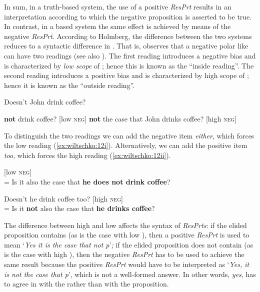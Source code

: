 \documentclass[output=paper]{LSP/langsci}
\begin{document}
In sum, in a truth-based system, the use of a positive \textit{ResPrt} results in an interpretation according to which the negative proposition is asserted to be true.
In contrast, in a  based system the same effect is achieved by means of the negative \textit{ResPrt}. According to Holmberg, the difference between the two systems reduces to a syntactic difference in . That is, \citet{Ladd1981} observes that a negative polar  like  can have two readings (see also \citealt{BüringGunlogson2000,RomeroHan2004,AsherReese2007}). The first reading  introduces a negative bias and is characterized by \textit{low scope} of ; hence this is known as the “inside  reading”. The second reading  introduces a positive bias and is characterized by high scope of ; hence it is known as the “outside  reading”. 

\ea\label{ex:wiltschko:11}
\begin{xlist}   Doesn’t John drink coffee?

\begin{xlisti}
  \ex\label{ex:wiltschko:11i} \textbf{{not}} {drink coffee?}  [low \textsc{neg}]
  \ex\label{ex:wiltschko:11ii} \textbf{{not}} {the case that John drinks coffee?}  [high \textsc{neg}]
\end{xlisti}\end{xlist}
\z

To distinguish the two readings we can add the negative  item \textit{either}, which forces the low  reading (\ref{ex:wiltschko:12i}). Alternatively, we can add the positive  item \textit{too}, which forces the high  reading (\ref{ex:wiltschko:12ii}).  

\ea\label{ex:wiltschko:12}
\begin{xlisti}
\ex\label{ex:wiltschko:12i}        [low \textsc{neg}]\\
= Is it also the case that \textbf{he does not drink coffee}?

\ex\label{ex:wiltschko:12ii}  {Doesn’t he drink coffee too?}         [high \textsc{neg}]\\
      = Is it \textbf{not} also the case that \textbf{he drinks coffee}?
\end{xlisti}
\z

\noindent The difference between high and low  affects the syntax of \textit{ResPrts}: if the elided proposition contains  (as is the case with low ), then a positive \textit{ResPrt} is used to mean ‘\textit{Yes it is the case that not p}’\textit{;} if the elided proposition does not contain  (as is the case with high ), then the negative \textit{ResPrt} has to be used to achieve the same result because the positive \textit{ResPrt} would have to be interpreted as ‘\textit{Yes, it is not the case that p}’, which is not a well-formed answer. In other words, \textit{yes}, has to agree in  with the  rather than with the proposition. 
\end{document}
